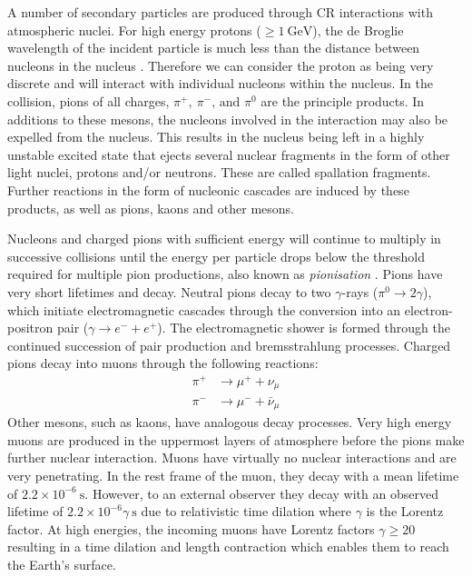 A number of secondary particles are produced through CR interactions with atmospheric nuclei. For high energy protons ($\geq 1~\text{GeV}$), the de Broglie wavelength of the incident particle is much less than the distance between nucleons in the nucleus \cite{Longair_2011}. Therefore we can consider the proton as being very discrete and will interact with individual nucleons within the nucleus. In the collision, pions of all charges, $\pi^+,\:\pi^-\text{, and }\pi^0$ are the principle products. In additions to these mesons, the nucleons involved in the interaction may also be expelled from the nucleus. This results in the nucleus being left in a highly unstable excited state that ejects several nuclear fragments in the form of other light nuclei, protons and/or neutrons. These are called spallation fragments. Further reactions in the form of nucleonic cascades are induced by these products, as well as pions, kaons and other mesons.

Nucleons and charged pions with sufficient energy will continue to multiply in successive collisions until the energy per particle drops below the threshold required for multiple pion productions, also known as \textit{pionisation} \cite{Longair_2011}. Pions have very short lifetimes and decay. Neutral pions decay to two $\gamma$-rays ($\pi^0\rightarrow2\gamma$), which initiate electromagnetic cascades through the conversion into an electron-positron pair ($\gamma\rightarrow e^-+e^+$). The electromagnetic shower is formed through the continued succession of pair production and bremsstrahlung processes. Charged pions decay into muons through the following reactions:
\begin{equation}
\begin{split}
    \pi^+&\rightarrow\mu^++\nu_\mu \\
    \pi^-&\rightarrow\mu^-+\bar\nu_\mu
\end{split}
\end{equation}
Other mesons, such as kaons, have analogous decay processes. Very high energy muons are produced in the uppermost layers of atmosphere before the pions make further nuclear interaction. Muons have virtually no nuclear interactions and are very penetrating. In the rest frame of the muon, they decay with a mean lifetime of $2.2\times10^{-6}~\text{s}$. However, to an external observer they decay with an observed lifetime of $2.2\times10^{-6}\gamma~\text{s}$ due to relativistic time dilation where $\gamma$ is the Lorentz factor. At high energies, the incoming muons have Lorentz factors $\gamma\geq20$ resulting in a time dilation and length contraction which enables them to reach the Earth's surface. 

